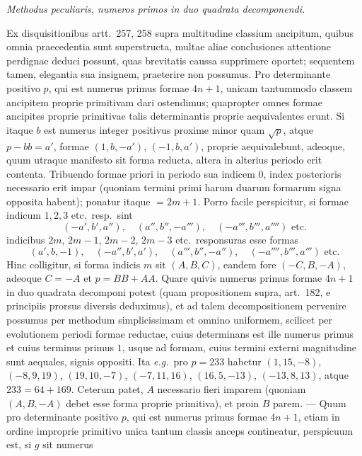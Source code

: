 \begin{center}
\textit{Methodus peculiaris, numeros primos in duo quadrata decomponendi.}
\end{center}

Ex disquisitionibus artt.\ 257, 258 supra multitudine classium ancipitum,
quibus omnia praecedentia sunt superstructa, multae aliae conclusiones attentione
perdignae deduci possunt, quas brevitatis caussa supprimere oportet; sequentem
tamen, elegantia sua insignem, praeterire non possumus. Pro determinante
positivo $p$, qui est numerus primus formae $4n+1$, unicam tantummodo
classem ancipitem proprie primitivam dari ostendimus; quapropter omnes formae
ancipites proprie primitivae talis determinantis proprie aequivalentes erunt. Si
itaque $b$ est numerus integer positivus proxime minor quam $\surd p$, atque $p-bb
=a'$, formae $(1, b, -a')$, $(-1, b, a')$, proprie aequivalebunt, adeoque, quum utraque
manifesto sit forma reducta, altera in alterius periodo erit contenta. Tribuendo
formae priori in periodo sua indicem $0$, index posterioris necessario erit impar (quoniam
termini primi harum duarum formarum signa opposita habent); ponatur itaque
$=2m+1$. Porro facile perspicitur, si formae indicum $1, 2, 3$ etc.\ resp.\ sint
\[
(-a', b', a''),\quad (a'', b'', -a'''),\quad (-a''', b''', a'''')\text{ etc.}
\]
indicibus $2m$, $2m-1$, $2m-2$, $2m-3$ etc.\ responsuras esse formas
\[
(a', b, -1),\quad (-a'', b', a'),\quad (a''', b'', -a''),\quad (-a'''', b''', a''')\text{ etc.}
\]
Hinc colligitur, si forma indicis $m$ sit $(A, B, C)$, eandem fore $(-C, B, -A)$,
adeoque $C=-A$ et $p=BB+AA$. Quare quivis numerus primus formae
$4n+1$ in duo quadrata decomponi potest (quam propositionem supra, art.\ 182,
e principiis prorsus diversis deduximus), et ad talem decompositionem pervenire
possumus per methodum simplicissimam et omnino uniformem, scilicet per evolutionem
periodi formae reductae, cuius determinans est ille numerus primus et cuius
terminus primus $1$, usque ad formam, cuius termini externi magnitudine sunt
aequales, signis oppositi. Ita \textit{e.g.}\ pro $p=233$ habetur $(1, 15, -8)$, $(-8, 9, 19)$,
$(19, 10, -7)$, $(-7, 11, 16)$, $(16, 5, -13)$, $(-13, 8, 13)$, atque $233=64+169$.
Ceterum patet, $A$ necessario fieri imparem (quoniam $(A, B, -A)$ debet esse
forma proprie primitiva), et proin $B$ parem. --- Quum pro determinante positivo
$p$, qui est numerus primus formae $4n+1$, etiam in ordine improprie primitivo
unica tantum classis anceps contineatur, perspicuum est, si $g$ sit numerus
